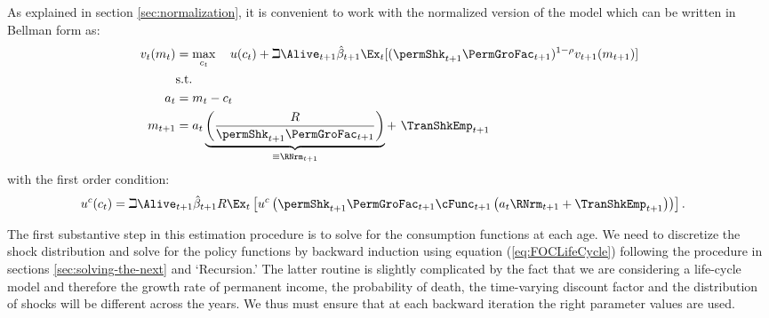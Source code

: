 As explained in section \ref{sec:normalization}, it is convenient to work with the normalized version of the model which can be written in Bellman form as:
  \begin{equation*}\begin{gathered}\begin{aligned}
        {v}_{t}({m}_{t})  & = \max_{{c}_{t}}~~~ u({c}_{t})+\beth\Alive_{t+1}\hat{\beta}_{t+1}
        \Ex_{t}[(\permShk_{t+1}\PermGroFac_{t+1})^{1-\rho}{v}_{t+1}({m}_{t+1})]   \\
        & \text{s.t.}   \nonumber \\
        {a}_{t}    & = {m}_{t}-{c}_{t} \nonumber
        \\      {m}_{t+1}  & = {a}_{t}\underbrace{\left(\frac{R}{\permShk_{t+1}\PermGroFac_{t+1}}\right)}_{\equiv \RNrm_{t+1}}+ ~\TranShkEmp_{t+1}
      \end{aligned}\end{gathered}\end{equation*}
with the first order condition:
  \begin{equation}\begin{gathered}\begin{aligned}
        u^{{c}}({c}_{t}) & = \beth\Alive_{t+1}\hat{\beta}_{t+1}R \Ex_{t}\left[u^{{c}}\left(\permShk_{t+1}\PermGroFac_{t+1}\cFunc_{t+1}\left({a}_{t}\RNrm_{t+1}+\TranShkEmp_{t+1}\right)\right)\right]\label{eq:FOCLifeCycle}
        .
      \end{aligned}\end{gathered}\end{equation}

The first substantive {step} in this estimation procedure is
to solve for the consumption functions at each age. We need to
discretize the shock distribution and solve for the policy
functions by backward induction using equation (\ref{eq:FOCLifeCycle})
following the procedure in sections \ref{sec:solving-the-next} and
`Recursion.' The latter routine
is slightly complicated by the fact that we are considering a
life-cycle model and therefore the growth rate of permanent income,
the probability of death, the time-varying discount factor and the
distribution of shocks will be different across the years. We thus
must ensure that at each backward iteration the right parameter
values are used.

